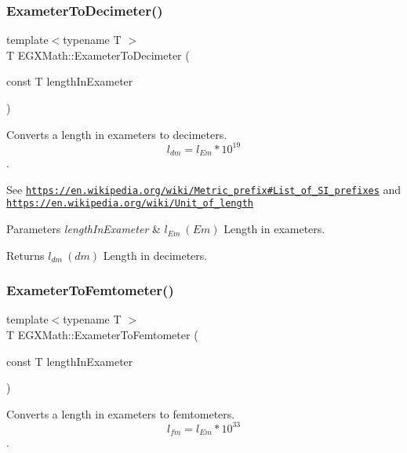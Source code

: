 \subsubsection{\texorpdfstring{Exameter\+To\+Decimeter()}{ExameterToDecimeter()}}
{\footnotesize\ttfamily template$<$typename T $>$ \\
T E\+G\+X\+Math\+::\+Exameter\+To\+Decimeter (\begin{DoxyParamCaption}\item[{const T}]{length\+In\+Exameter }\end{DoxyParamCaption})}



Converts a length in exameters to decimeters. \[ l_{dm}=l_{Em} * 10^{19} \]. 

See \href{https://en.wikipedia.org/wiki/Metric_prefix#List_of_SI_prefixes}{\tt https\+://en.\+wikipedia.\+org/wiki/\+Metric\+\_\+prefix\#\+List\+\_\+of\+\_\+\+S\+I\+\_\+prefixes} and \href{https://en.wikipedia.org/wiki/Unit_of_length}{\tt https\+://en.\+wikipedia.\+org/wiki/\+Unit\+\_\+of\+\_\+length} 
\begin{DoxyParams}{Parameters}
{\em length\+In\+Exameter} & $ l_{Em}\ (Em)$ Length in exameters. \\
\hline
\end{DoxyParams}
\begin{DoxyReturn}{Returns}
$ l_{dm}\ (dm)$ Length in decimeters. 
\end{DoxyReturn}
\mbox{\label{group___e_g_x_math-_conversions-_length_conversions-_exameter-_s_i_gaaa4f07b6d6b2e4a9e1947d4d9724c110}} 
\subsubsection{\texorpdfstring{Exameter\+To\+Femtometer()}{ExameterToFemtometer()}}
{\footnotesize\ttfamily template$<$typename T $>$ \\
T E\+G\+X\+Math\+::\+Exameter\+To\+Femtometer (\begin{DoxyParamCaption}\item[{const T}]{length\+In\+Exameter }\end{DoxyParamCaption})}



Converts a length in exameters to femtometers. \[ l_{fm}=l_{Em} * 10^{33} \]. 

